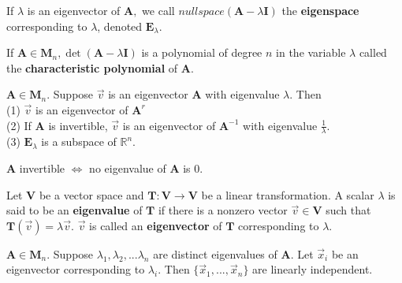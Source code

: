 \documentclass{article}
\begin{document}
\begin{definition}
If $\lambda$ is an eigenvector of $\boldsymbol{A},$ we call $nullspace(\boldsymbol{A} - \lambda\boldsymbol{I})$ the \textbf{eigenspace} corresponding to $\lambda$, denoted $\boldsymbol{E}_{\lambda}.$
\end{definition}

\begin{definition}
If $\boldsymbol{A} \in \boldsymbol{M}_n, \det(\boldsymbol{A} - \lambda\boldsymbol{I})$ is a polynomial of degree $n$ in the variable $\lambda$ called the \textbf{characteristic polynomial} of $\boldsymbol{A}.$
\end{definition}

\begin{theorem}
$\boldsymbol{A} \in \boldsymbol{M}_n.$ Suppose $\vec{v}$ is an eigenvector $\boldsymbol{A}$ with eigenvalue $\lambda.$ Then \\
(1) $\vec{v}$ is an eigenvector of $\boldsymbol{A}^r$ \\
(2) If $\boldsymbol{A}$ is invertible, $\vec{v}$ is an eigenvector of $\boldsymbol{A}^{-1}$ with eigenvalue $\frac{1}{\lambda}.$ \\
(3) $\boldsymbol{E}_{\lambda}$ is a subspace of $\mathbb{R}^n.$
\end{theorem}

\begin{theorem}
$\boldsymbol{A}$ invertible $\iff$ no eigenvalue of $\boldsymbol{A}$ is $0$.
\end{theorem}

\begin{definition}
Let $\boldsymbol{V}$ be a vector space and $\boldsymbol{T}: \boldsymbol{V} \rightarrow \boldsymbol{V}$ be a linear transformation. A scalar $\lambda$ is said to be an \textbf{eigenvalue} of $\boldsymbol{T}$ if there is a nonzero vector $\vec{v} \in \boldsymbol{V}$ such that $\boldsymbol{T}(\vec{v}) = \lambda \vec{v}.$ $\vec{v}$ is called an \textbf{eigenvector} of $\boldsymbol{T}$ corresponding to $\lambda.$
\end{definition}

\begin{theorem}
$\boldsymbol{A} \in \boldsymbol{M}_n.$ Suppose $\lambda_1, \lambda_2, ... \lambda_n$ are distinct eigenvalues of $\boldsymbol{A}.$ Let $\vec{x}_i$ be an eigenvector corresponding to $\lambda_i.$ Then $\{\vec{x}_1, ... , \vec{x}_n\}$ are linearly independent. \\ \\
\end{theorem}
\end{document}
